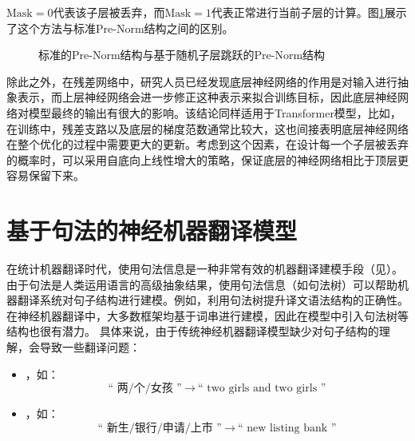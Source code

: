 \noindent $\textrm{Mask}=0$代表该子层被丢弃，而$\textrm{Mask}=1$代表正常进行当前子层的计算。图\ref{fig:15-19}展示了这个方法与标准Pre-Norm结构之间的区别。

\begin{figure}[htp]
\centering

\caption{标准的Pre-Norm结构与基于随机子层跳跃的Pre-Norm结构}
\label{fig:15-19}
\end{figure}

\parinterval 除此之外，在残差网络中，研究人员已经发现底层神经网络的作用是对输入进行抽象表示，而上层神经网络会进一步修正这种表示来拟合训练目标，因此底层神经网络对模型最终的输出有很大的影响。该结论同样适用于Transformer模型，比如，在训练中，残差支路以及底层的梯度范数通常比较大，这也间接表明底层神经网络在整个优化的过程中需要更大的更新。考虑到这个因素，在设计每一个子层被丢弃的概率时，可以采用自底向上线性增大的策略，保证底层的神经网络相比于顶层更容易保留下来。


\sectionnewpage
\section{基于句法的神经机器翻译模型}

\parinterval 在统计机器翻译时代，使用句法信息是一种非常有效的机器翻译建模手段（见{\chaptereight}）。由于句法是人类运用语言的高级抽象结果，使用句法信息（如句法树）可以帮助机器翻译系统对句子结构进行建模。例如，利用句法树提升译文语法结构的正确性。在神经机器翻译中，大多数框架均基于词串进行建模，因此在模型中引入句法树等结构也很有潜力。 具体来说，由于传统神经机器翻译模型缺少对句子结构的理解，会导致一些翻译问题：

\begin{itemize}
\vspace{0.5em}
\item {\small{}}，如：
\begin{equation}
\textrm{“ 两/个/女孩 ”}\ \to \ \textrm{“ two girls and two girls ”} \nonumber
\end{equation}

\vspace{0.5em}
\item {\small{}}，如：
\begin{equation}
\textrm{“ 新生/银行/申请/上市 ”}\ \to \ \textrm{“ new listing bank ”} \nonumber
\end{equation}

\vspace{0.5em}
\end{itemize}

